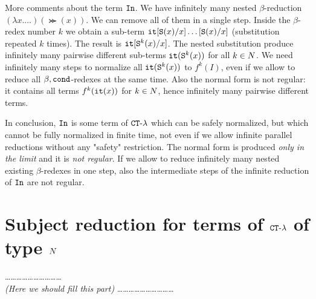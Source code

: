 \documentclass{article}
\begin{document}

More comments about the term ${\tt In}$.
We have infinitely many nested $\beta$-reduction $(\lambda x. \ldots)(\Succ (x))$.
We can remove all of them in a single step. Inside the $\beta$-redex number $k$ we obtain a sub-term
${\tt it}[{\tt S} (x)/x]\ldots[{\tt S} (x)/x]$ (substitution repeated $k$ times).
The result is ${\tt it}[{\tt S} ^k(x)/x] $.
The nested substitution produce infinitely many pairwise different sub-terms 
${\tt it}({\tt S} ^k(x))$ for all $k \in {N}$.
We need infinitely many steps to normalize all ${\tt it}({\tt S} ^k(x))$ to $f^k(I)$, 
even if we allow to reduce all $\beta,{\tt cond}$-redexes at the same time.
Also the normal form is not regular: it contains all terms $f^k({\tt it}(x))$ for $k \in {N}$, hence
infinitely many pairwise different terms. 

In conclusion, 
${\tt In}$ is some term of ${ {\tt CT} \mbox{-} \lambda}$ which can be safely normalized, but which 
cannot be fully normalized in finite time, not even if we allow
infinite parallel reductions without any "safety" restriction. 
The normal form is produced \emph{only in the limit}
and it is \emph{not regular}. If we allow to reduce infinitely many nested existing
$\beta$-redexes in one step, also
the intermediate steps of the infinite reduction of ${\tt In}$ are not regular.


\section{Subject reduction for terms of ${ {\tt CT} \mbox{-} \lambda}$ of type ${N}$}
\ldots\ldots\ldots\ldots\ldots\ldots\ldots\ldots\ldots\ldots
\\
\emph{(Here we should fill this part)}
\ldots\ldots\ldots\ldots\ldots\ldots\ldots\ldots\ldots\ldots
\end{document}
